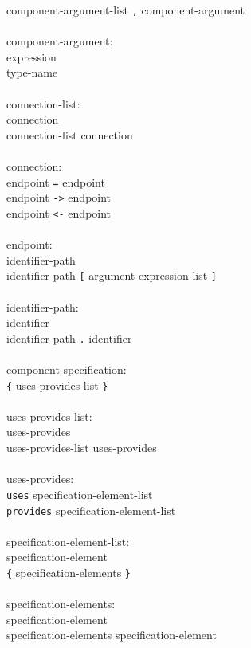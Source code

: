 \documentclass[11pt,letterpaper]{article}
\newcommand{\kw}[1]{{\tt #1}}
\begin{document}
\begin{tabbing}
\>	component-argument-list \kw{,} component-argument\\
\\
component-argument:\\
\>	expression\\
\>	type-name\\
\\
connection-list:\\
\>	connection\\
\>	connection-list connection\\
\\
connection:\\
\>	endpoint \kw{=} endpoint\\
\>	endpoint \kw{->} endpoint\\
\>	endpoint \kw{<-} endpoint\\
\\
endpoint:\\
\>	identifier-path \\
\>	identifier-path \kw{[} argument-expression-list \kw{]}\\
\\
identifier-path:\\
\>	identifier\\
\>	identifier-path \kw{.} identifier\\
\\
component-specification:\\
\>	\kw{\{} uses-provides-list \kw{\}}\\
\\
uses-provides-list:\\
\>	uses-provides\\
\>	uses-provides-list uses-provides\\
\\
uses-provides:\\
\>	\kw{uses} specification-element-list\\
\>	\kw{provides} specification-element-list\\
\\
specification-element-list:\\
\>	specification-element\\
\>	\kw{\{} specification-elements \kw{\}}\\
\\
specification-elements:\\
\>	specification-element\\
\>	specification-elements specification-element\\
\\

\end{tabbing}
\end{document}
